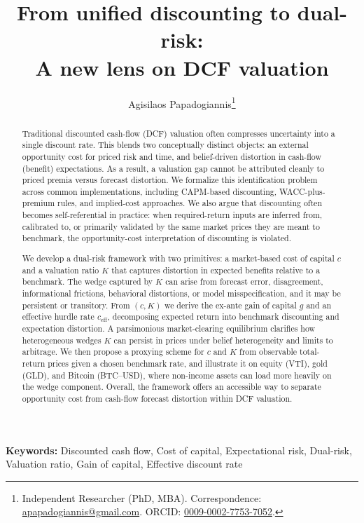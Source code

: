 \documentclass[10pt]{article}
\title{\Large From unified discounting to dual-risk:\\ A new lens on DCF valuation}
\author{Agisilaos Papadogiannis\thanks{Independent Researcher (PhD, MBA). Correspondence: \href{mailto:apapadogiannis@gmail.com}{apapadogiannis@gmail.com}. ORCID: \href{https://orcid.org/0009-0002-7753-7052}{0009-0002-7753-7052}.}}
\date{}
\begin{document}
\maketitle
\thispagestyle{empty}
\vspace{-1.5em}

\begin{abstract}
\noindent Traditional discounted cash-flow (DCF) valuation often compresses uncertainty into a single discount rate. This blends two conceptually distinct objects: an external opportunity cost for priced risk and time, and belief-driven distortion in cash-flow (benefit) expectations. As a result, a valuation gap cannot be attributed cleanly to priced premia versus forecast distortion. We formalize this identification problem across common implementations, including CAPM-based discounting, WACC-plus-premium rules, and implied-cost approaches. We also argue that discounting often becomes self-referential in practice: when required-return inputs are inferred from, calibrated to, or primarily validated by the same market prices they are meant to benchmark, the opportunity-cost interpretation of discounting is violated.

We develop a dual-risk framework with two primitives: a market-based cost of capital \(c\) and a valuation ratio \(K\) that captures distortion in expected benefits relative to a benchmark. The wedge captured by \(K\) can arise from forecast error, disagreement, informational frictions, behavioral distortions, or model misspecification, and it may be persistent or transitory. From \((c,K)\) we derive the ex-ante gain of capital \(g\) and an effective hurdle rate \(c_{\mathrm{eff}}\), decomposing expected return into benchmark discounting and expectation distortion. A parsimonious market-clearing equilibrium clarifies how heterogeneous wedges \(K\) can persist in prices under belief heterogeneity and limits to arbitrage. We then propose a proxying scheme for \(c\) and \(K\) from observable total-return prices given a chosen benchmark rate, and illustrate it on equity (VTI), gold (GLD), and Bitcoin (BTC--USD), where non-income assets can load more heavily on the wedge component. Overall, the framework offers an accessible way to separate opportunity cost from cash-flow forecast distortion within DCF valuation.
\end{abstract}

\noindent\textbf{Keywords:} Discounted cash flow, Cost of capital, Expectational risk, Dual-risk, Valuation ratio, Gain of capital, Effective discount rate
\end{document}

